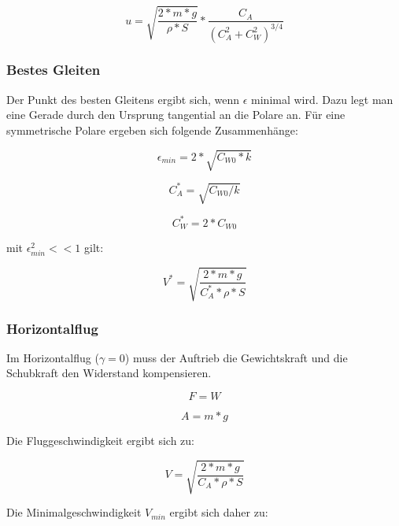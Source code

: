 \begin{equation}
u = \sqrt{{\frac{2 * m * g}{\rho * S}}} * \frac{C_A}{(C^2_A + C^2_W)^{3/4}}
\end{equation}

\subsubsection{Bestes Gleiten}
\label{bestesgleiten}

Der Punkt des besten Gleitens ergibt sich, wenn $\epsilon$ minimal wird. Dazu legt man eine Gerade durch den Ursprung tangential an die Polare an. Für eine symmetrische Polare ergeben sich folgende Zusammenhänge:

\begin{equation}
\epsilon_{min} = 2 * \sqrt{C_{W0} * k}
\end{equation}

\begin{equation}
C^*_A = \sqrt{C_{W0} / k}
\end{equation}

\begin{equation}
C^*_W = 2 * C_{W0}
\end{equation}

mit $\epsilon^2_{min} << 1$ gilt:

\begin{equation}
V^* = \sqrt{\frac{2 * m * g}{C^*_A * \rho * S}}
\end{equation}

\subsubsection{Horizontalflug}
\label{horizontalflug}

Im Horizontalflug ($\gamma = 0$) muss der Auftrieb die Gewichtskraft und die Schubkraft den Widerstand kompensieren.

\begin{equation}
F = W
\end{equation}

\begin{equation}
A = m * g
\end{equation}

Die Fluggeschwindigkeit ergibt sich zu:

\begin{equation}
V = \sqrt{\frac{2 * m * g}{C_A * \rho * S}}
\end{equation}

Die Minimalgeschwindigkeit $V_{min}$ ergibt sich daher zu:

